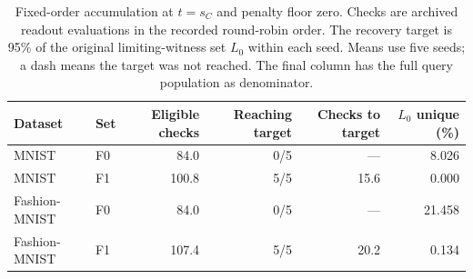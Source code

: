 \begin{table}[!htbp]
\centering\small
\caption{Fixed-order accumulation at $t=s_C$ and penalty floor zero. Checks are archived readout evaluations in the recorded round-robin order. The recovery target is 95\% of the original limiting-witness set $L_0$ within each seed. Means use five seeds; a dash means the target was not reached. The final column has the full query population as denominator.}
\label{tab:r4-probes}
\begin{tabular}{@{}llrrrr@{}}
\toprule
Dataset & Set & Eligible checks & Reaching target & Checks to target & $L_0$ unique (\%)\\
\midrule
MNIST & F0 & 84.0 & 0/5 & --- & 8.026\\
MNIST & F1 & 100.8 & 5/5 & 15.6 & 0.000\\
Fashion-MNIST & F0 & 84.0 & 0/5 & --- & 21.458\\
Fashion-MNIST & F1 & 107.4 & 5/5 & 20.2 & 0.134\\
\bottomrule
\end{tabular}
\end{table}
